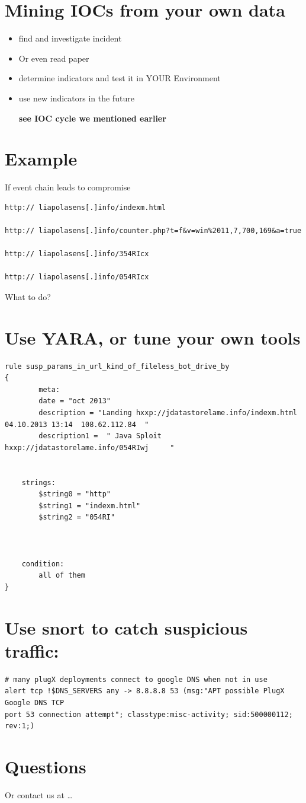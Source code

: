 \documentclass[11pt]{article}
\begin{document}
\section*{Mining IOCs from your own data}
\label{sec-19}
\begin{itemize}
\item find and investigate incident
\item Or even read paper
\item determine indicators and test it in YOUR Environment
\item use new indicators in the future

\textbf{see IOC cycle we mentioned earlier}
\end{itemize}
\section*{Example}
\label{sec-20}
If event chain leads to compromise
\begin{verbatim}
http:// liapolasens[.]info/indexm.html

http:// liapolasens[.]info/counter.php?t=f&v=win%2011,7,700,169&a=true

http:// liapolasens[.]info/354RIcx

http:// liapolasens[.]info/054RIcx
\end{verbatim}
What to do?
\section*{Use YARA, or tune your own tools}
\label{sec-21}
\begin{verbatim}
rule susp_params_in_url_kind_of_fileless_bot_drive_by
{
        meta:
        date = "oct 2013"
        description = "Landing hxxp://jdatastorelame.info/indexm.html  04.10.2013 13:14  108.62.112.84  "  
        description1 =  " Java Sploit hxxp://jdatastorelame.info/054RIwj     "


    strings:
        $string0 = "http"
        $string1 = "indexm.html"
        $string2 = "054RI"



    condition:
        all of them
}
\end{verbatim}
\section*{Use snort to catch suspicious traffic:}
\label{sec-22}

\begin{verbatim}
# many plugX deployments connect to google DNS when not in use
alert tcp !$DNS_SERVERS any -> 8.8.8.8 53 (msg:"APT possible PlugX Google DNS TCP
port 53 connection attempt"; classtype:misc-activity; sid:500000112;
rev:1;)
\end{verbatim}
\section*{Questions}
\label{sec-23}

Or contact us at \ldots{}
\end{document}
